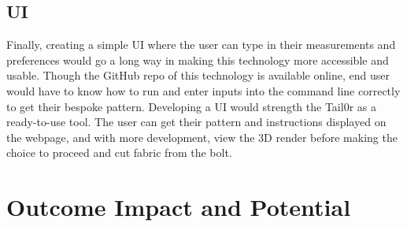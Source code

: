 \subsection{UI}
Finally, creating a simple UI where the user can type in their measurements and preferences would go a long way in making this technology more accessible and usable. Though the GitHub repo of this technology is available online, end user would have to know how to run and enter inputs into the command line correctly to get their bespoke pattern. Developing a UI would strength the Tail0r as a ready-to-use tool. The user can get their pattern and instructions displayed on the webpage, and with more development, view the 3D render before making the choice to proceed and cut fabric from the bolt.

\section{Outcome Impact and Potential}
